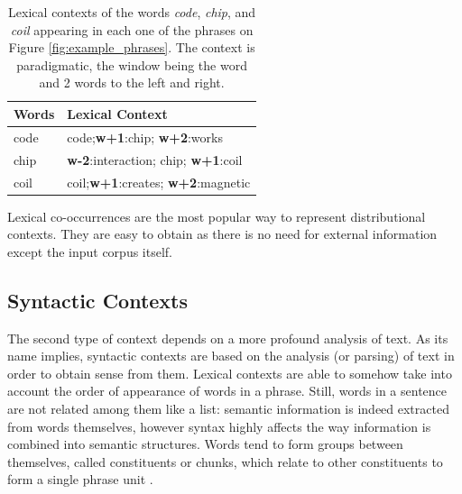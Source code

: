 \begin{table}[]
\centering
\caption{Lexical contexts of the words \textit{code}, \textit{chip}, and \textit{coil} appearing in each one of the phrases on Figure \ref{fig:example_phrases}. The context is paradigmatic, the window being the word and 2 words to the left and right.}
\label{tab:exo_lexical_contxt}
\begin{tabular}{@{}ll@{}}
\toprule
Words & Lexical Context                        \\ \midrule
code  & code;\textbf{w+1}:chip; \textbf{w+2}:works                    \\
chip  & \textbf{w-2}:interaction; chip; \textbf{w+1}:coil \\
coil  & coil;\textbf{w+1}:creates; \textbf{w+2}:magnetic              \\ \bottomrule
\end{tabular}
\end{table}

Lexical co-occurrences are the most popular way to represent distributional contexts. They are easy to obtain as there is no need for external information except the input corpus itself. 
 




%
\subsection{Syntactic Contexts}

The second type of context depends on a more profound analysis of text. As its name implies, syntactic contexts are based on the analysis (or parsing) of text in order to obtain sense from them. Lexical contexts are able to somehow take into account the order of appearance of words in a phrase. Still, words in a sentence are not related among them like a list: semantic information is indeed extracted from words themselves, however syntax highly affects the way information is combined into semantic structures. Words tend to form groups between themselves, called constituents or chunks, which relate to other constituents to form a single phrase unit \cite{bender2013linguistic}.

